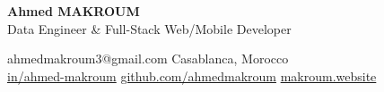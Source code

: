 \documentclass[10pt,a4paper,sans]{moderncv}
\begin{document}
\begin{center}
    {\fontsize{20}{22}\selectfont\textbf{Ahmed MAKROUM}}\\[0.5em]
    {\fontsize{13.2}{15.4}\selectfont Data Engineer \& Full-Stack Web/Mobile Developer} \\[0.4em]
    {\fontsize{10.5}{12.3}\selectfont
        
        \faEnvelope\enspace ahmedmakroum3@gmail.com \quad
        \faHome\enspace Casablanca, Morocco \\[0.3em]
        \faLinkedin\enspace \href{https://www.linkedin.com/in/ahmed-makroum/}{in/ahmed-makroum} \quad
        \faGithub\enspace \href{https://github.com/ahmedmakroum}{github.com/ahmedmakroum} \quad
        \faGlobe\enspace \href{https://makroum.website}{makroum.website}
    }\\[0.5em]
\end{center}
\vspace{-25pt}


\end{document}
